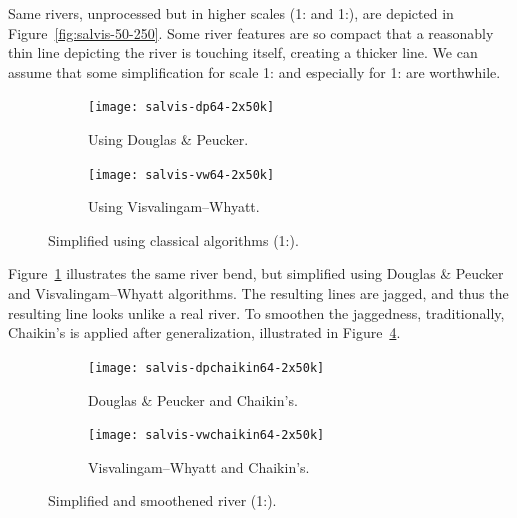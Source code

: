 \documentclass[a4paper]{article}
\newcommand{\DP}{Douglas \& Peucker}
\newcommand{\VW}{Visvalingam--Whyatt}
\begin{document}
Same rivers, unprocessed but in higher scales (1: and
1:), are depicted in Figure~\ref{fig:salvis-50-250}. Some
river features are so compact that a reasonably thin line depicting the river
is touching itself, creating a thicker line. We can assume that some
simplification for scale 1: and especially for
1: are worthwhile.

\begin{figure}[ht]
    \centering
    \begin{subfigure}[b]{.49\textwidth}
        \texttt{[image: salvis-dp64-2x50k]}
        \caption{Using {\DP}.}
    \end{subfigure}
    \hfill
    \begin{subfigure}[b]{.49\textwidth}
        \texttt{[image: salvis-vw64-2x50k]}
        \caption{Using {\VW}.}
    \end{subfigure}
    \caption{Simplified using classical algorithms (1:).}
    \label{fig:salvis-generalized-1x50k}
\end{figure}

Figure~\ref{fig:salvis-generalized-1x50k} illustrates the same river bend, but
simplified using {\DP} and {\VW} algorithms. The resulting lines are jagged,
and thus the resulting line looks unlike a real river. To smoothen the jaggedness,
traditionally, Chaikin's\cite{chaikin1974algorithm} is applied after
generalization, illustrated in Figure~\ref{fig:salvis-generalized-chaikin-1x50k}.

\begin{figure}[ht!]
    \centering
    \begin{subfigure}[b]{.49\textwidth}
        \texttt{[image: salvis-dpchaikin64-2x50k]}
        \caption{{\DP} and Chaikin's.}
        \label{fig:salvis-dpchaikin64-2x50k}
    \end{subfigure}
    \hfill
    \begin{subfigure}[b]{.49\textwidth}
        \texttt{[image: salvis-vwchaikin64-2x50k]}
        \caption{{\VW} and Chaikin's.}
        \label{fig:salvis-vwchaikin64-2x50k}
    \end{subfigure}
    \caption{Simplified and smoothened river (1:).}
    \label{fig:salvis-generalized-chaikin-1x50k}
\end{figure}
\end{document}
